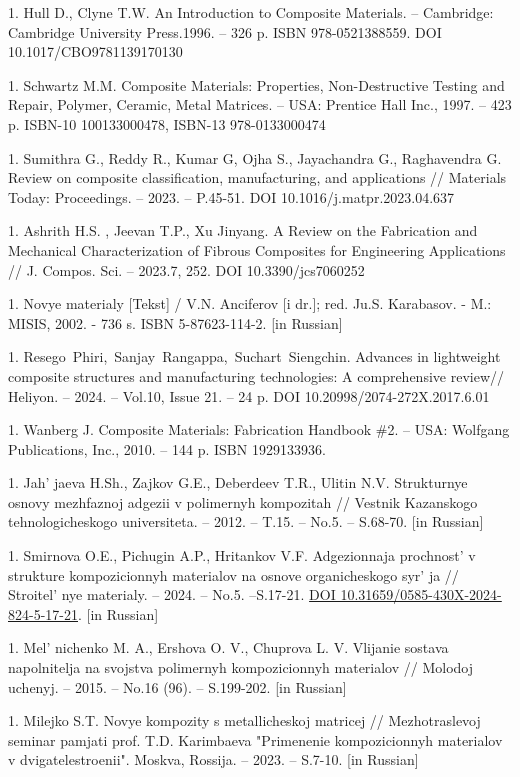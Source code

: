 1. Hull D., Clyne T.W. An Introduction to Composite Materials. --
Cambridge: Cambridge University Press.1996. -- 326 p. ISBN
978-0521388559. DOI 10.1017/CBO9781139170130

1. Schwartz M.M. Composite Materials: Properties, Non-Destructive Testing
and Repair, Polymer, Ceramic, Metal Matrices. -- USA: Prentice Hall
Inc., 1997. -- 423 p. ISBN-10 100133000478, ISBN-13 978-0133000474

1. Sumithra G., Reddy R., Kumar G, Ojha S., Jayachandra G., Raghavendra
G. Review on composite classification, manufacturing, and applications
// Materials Today: Proceedings. -- 2023. -- P.45-51. DOI
10.1016/j.matpr.2023.04.637

1. Ashrith H.S. , Jeevan T.P., Xu Jinyang. A Review on the Fabrication
and Mechanical Characterization of Fibrous Composites for Engineering
Applications // J. Compos. Sci. -- 2023.7, 252. DOI
10.3390/jcs7060252

1. Novye materialy {[}Tekst{]} / V.N. Anciferov {[}i dr.{]}; red. Ju.S.
Karabasov. - M.: MISIS, 2002. - 736 s. ISBN 5-87623-114-2. {[}in
Russian{]}

1. Resego~Phiri,~Sanjay~Rangappa,~Suchart~Siengchin. Advances in
lightweight composite structures and manufacturing technologies: A
comprehensive review// Heliyon. -- 2024. -- Vol.10, Issue 21. -- 24
p. DOI 10.20998/2074-272X.2017.6.01

1. Wanberg J. Composite Materials: Fabrication Handbook \#2. -- USA:
Wolfgang Publications, Inc., 2010. -- 144 p. ISBN 1929133936.

1. Jah' jaeva H.Sh., Zajkov G.E., Deberdeev T.R., Ulitin
N.V. Strukturnye osnovy mezhfaznoj adgezii v polimernyh kompozitah //
Vestnik Kazanskogo tehnologicheskogo universiteta. -- 2012. -- T.15.
-- No.5. -- S.68-70. {[}in Russian{]}

1. Smirnova O.E., Pichugin A.P., Hritankov V.F. Adgezionnaja
prochnost'{} v strukture kompozicionnyh materialov na
osnove organicheskogo syr' ja //
Stroitel' nye materialy. -- 2024. -- No.5. --S.17-21.
\href{https://doi.org/10.31659/0585-430X-2024-824-5-17-21}{DOI
10.31659/0585-430X-2024-824-5-17-21}. {[}in Russian{]}

1. Mel' nichenko M. A., Ershova O. V., Chuprova L. V.
Vlijanie sostava napolnitelja na svojstva polimernyh kompozicionnyh
materialov // Molodoj uchenyj. -- 2015. -- No.16 (96). -- S.199-202.
{[}in Russian{]}

1. Milejko S.T. Novye kompozity s metallicheskoj matricej //
Mezhotraslevoj seminar pamjati prof. T.D. Karimbaeva "Primenenie
kompozicionnyh materialov v dvigatelestroenii". Moskva, Rossija. --
2023. -- S.7-10. {[}in Russian{]}

